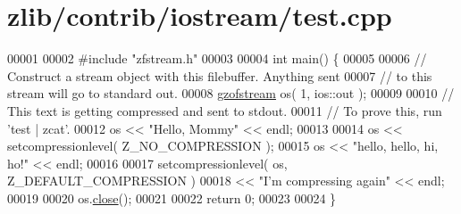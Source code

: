 \hypertarget{zlib_2contrib_2iostream_2test_8cpp_source}{}\section{zlib/contrib/iostream/test.cpp}
\label{zlib_2contrib_2iostream_2test_8cpp_source}

\begin{DoxyCode}
00001 
00002 \textcolor{preprocessor}{#include "zfstream.h"}
00003 
00004 \textcolor{keywordtype}{int} main() \{
00005 
00006   \textcolor{comment}{// Construct a stream object with this filebuffer.  Anything sent}
00007   \textcolor{comment}{// to this stream will go to standard out.}
00008   \hyperlink{classgzofstream}{gzofstream} os( 1, ios::out );
00009 
00010   \textcolor{comment}{// This text is getting compressed and sent to stdout.}
00011   \textcolor{comment}{// To prove this, run 'test | zcat'.}
00012   os << \textcolor{stringliteral}{"Hello, Mommy"} << endl;
00013 
00014   os << setcompressionlevel( Z\_NO\_COMPRESSION );
00015   os << \textcolor{stringliteral}{"hello, hello, hi, ho!"} << endl;
00016 
00017   setcompressionlevel( os, Z\_DEFAULT\_COMPRESSION )
00018     << \textcolor{stringliteral}{"I'm compressing again"} << endl;
00019 
00020   os.\hyperlink{classgzofstream_a59e8b01e1c9741085f18ca456c4b8f54}{close}();
00021 
00022   \textcolor{keywordflow}{return} 0;
00023 
00024 \}
\end{DoxyCode}
